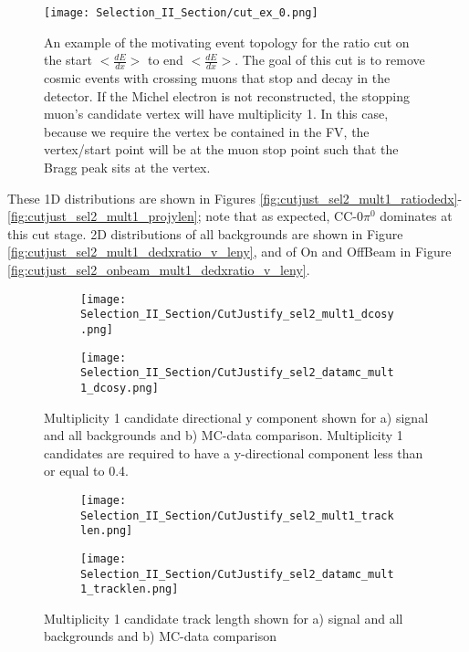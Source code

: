 \documentclass{article}
\begin{document}
\begin{figure}[h!]
\centering
\texttt{[image: Selection\_II\_Section/cut\_ex\_0.png]}
\caption{An example of the motivating event topology for the ratio cut on the start $<\frac{dE}{dx}>$ to end $<\frac{dE}{dx}>$.  The goal of this cut is to remove cosmic events with crossing muons that stop and decay in the detector. If the Michel electron is not reconstructed, the stopping muon’s candidate vertex will have multiplicity 1.  In this case, because we require the vertex be contained in the FV, the vertex/start point will be at the muon stop point such that the Bragg peak sits at the vertex. }
\label{fig:cut_ex_0}
\end{figure}

These 1D distributions are shown in Figures \ref{fig:cutjust_sel2_mult1_ratiodedx}-\ref{fig:cutjust_sel2_mult1_projylen}; note that as expected, CC-0$\pi^0$ dominates at this cut stage. 2D distributions of all backgrounds are shown in Figure \ref{fig:cutjust_sel2_mult1_dedxratio_v_leny}, and of On and OffBeam in Figure \ref{fig:cutjust_sel2_onbeam_mult1_dedxratio_v_leny}.

\begin{figure}[h!]
\centering
  \begin{subfigure}[t]{0.4\textwidth}
    \centering
\texttt{[image: Selection\_II\_Section/CutJustify\_sel2\_mult1\_dcosy.png]}
    \caption{ }
  \end{subfigure} 
  \hspace{20mm}
  \begin{subfigure}[t]{0.4\textwidth}
    \centering
\texttt{[image: Selection\_II\_Section/CutJustify\_sel2\_datamc\_mult1\_dcosy.png]}
    \caption{ }
  \end{subfigure} 
\caption{Multiplicity 1 candidate directional y component shown for a) signal and all backgrounds and b) MC-data comparison.  Multiplicity 1 candidates are required to have a y-directional component less than or equal to 0.4. }
\label{fig:cutjust_sel2_mult1_cosy}
\end{figure}

\begin{figure}[h!]
\centering
  \begin{subfigure}[t]{0.4\textwidth}
    \centering
\texttt{[image: Selection\_II\_Section/CutJustify\_sel2\_mult1\_tracklen.png]}
    \caption{ }
  \end{subfigure} 
  \hspace{20mm}
  \begin{subfigure}[t]{0.4\textwidth}
    \centering
\texttt{[image: Selection\_II\_Section/CutJustify\_sel2\_datamc\_mult1\_tracklen.png]}
    \caption{ }
  \end{subfigure} 
\caption{Multiplicity 1 candidate track length shown for a) signal and all backgrounds and b) MC-data comparison }
\label{fig:cutjust_sel2_mult1_len}
\end{figure}
\end{document}
